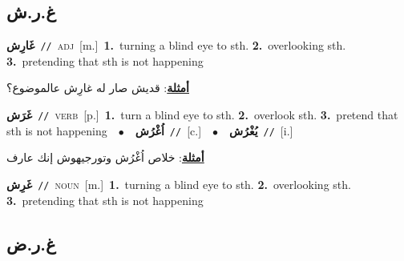 \documentclass[10pt,a4paper,twoside]{article} %
\begin{document}
\begin{multicols}{2}
\vspace{-3mm}
\subsection*{\color{blue}\foreignlanguage{arabic}{غ.ر.ش}\color{blue}{}} 

{\setlength\topsep{0pt}\textbf{\foreignlanguage{arabic}{غَارِش}}\ {\color{gray}\texttt{//}\color{black}}\ \textsc{adj}\ [m.]\ \textbf{1.}~turning a blind eye to sth.  \textbf{2.}~overlooking sth.  \textbf{3.}~pretending that sth is not happening\  \begin{flushright}\color{gray}\foreignlanguage{arabic}{\textbf{\underline{\foreignlanguage{arabic}{أمثلة}}}: قديش صار له غارِش عالموضوع؟}\end{flushright}\color{black}} \vspace{2mm}

{\setlength\topsep{0pt}\textbf{\foreignlanguage{arabic}{غَرَش}}\ {\color{gray}\texttt{//}\color{black}}\ \textsc{verb}\ [p.]\ \textbf{1.}~turn a blind eye to sth.  \textbf{2.}~overlook sth.  \textbf{3.}~pretend that sth is not happening\ \ $\bullet$\ \ \setlength\topsep{0pt}\textbf{\foreignlanguage{arabic}{اُغْرُش}}\ {\color{gray}\texttt{//}\color{black}}\ [c.]\ \ $\bullet$\ \ \setlength\topsep{0pt}\textbf{\foreignlanguage{arabic}{يُغْرُش}}\ {\color{gray}\texttt{//}\color{black}}\ [i.]\  \begin{flushright}\color{gray}\foreignlanguage{arabic}{\textbf{\underline{\foreignlanguage{arabic}{أمثلة}}}: خلاص اُغْرُش وتورجيهوش إنك عارف}\end{flushright}\color{black}} \vspace{2mm}

{\setlength\topsep{0pt}\textbf{\foreignlanguage{arabic}{غَرِش}}\ {\color{gray}\texttt{//}\color{black}}\ \textsc{noun}\ [m.]\ \textbf{1.}~turning a blind eye to sth.  \textbf{2.}~overlooking sth.  \textbf{3.}~pretending that sth is not happening\ } \vspace{2mm}

\vspace{-3mm}
\subsection*{\color{blue}\foreignlanguage{arabic}{غ.ر.ض}\color{blue}{}} 


\end{multicols}
\end{document}
